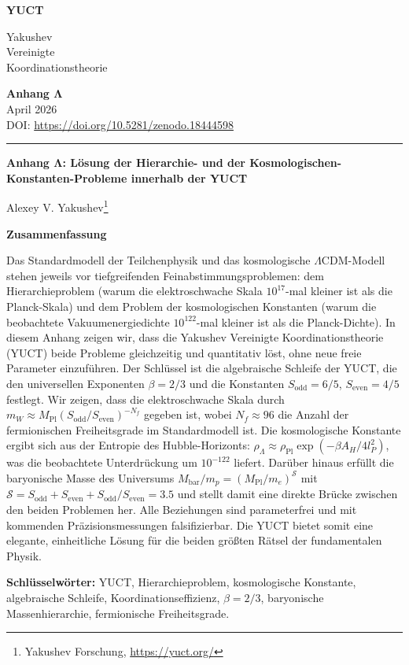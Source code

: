 \documentclass[11pt,a4paper]{article}
\theoremstyle{remark}
\newcommand{\makeheader}{%
	\noindent
	\begin{minipage}{0.17\textwidth}
		\raggedright
		{\sffamily\bfseries\color{skyblue}\fontsize{46}{46}\selectfont YUCT}%
	\end{minipage}%
	\hspace{30pt}
	\begin{minipage}{0.32\textwidth}
		\raggedright
		{\sffamily\fontsize{11}{13}\selectfont Yakushev\\ Vereinigte\\ Koordinationstheorie}%
	\end{minipage}%
	\hfill
	\begin{minipage}{0.38\textwidth}
		\raggedleft
		{\sffamily\bfseries Anhang Λ}\\
		{\sffamily April 2026}\\
		{\sffamily\footnotesize DOI: \url{https://doi.org/10.5281/zenodo.18444598}}%
	\end{minipage}
	\par\vspace{5pt}
	\noindent\textcolor{gold}{\rule{\textwidth}{1.6pt}}
	\par\vspace{0pt}
}
\begin{document}
	\renewcommand{\thepage}{\arabic{page}}
	\thispagestyle{firstpage}
	\makeheader
	
	\vspace{0cm}
	{\LARGE\bfseries Anhang Λ: Lösung der Hierarchie- und der Kosmologischen-Konstanten-Probleme innerhalb der YUCT \par}
	\vspace{0.2cm}
	
	{\large Alexey V. Yakushev\footnote{Yakushev Forschung, \url{https://yuct.org/}}} \\
	\vspace{0.0cm}
	
	{\color{darkblue}\textbf{\LARGE Zusammenfassung}} \par
	{\large
		\noindent
		Das Standardmodell der Teilchenphysik und das kosmologische \(\Lambda\)CDM-Modell stehen jeweils vor tiefgreifenden Feinabstimmungsproblemen: dem Hierarchieproblem (warum die elektroschwache Skala \(10^{17}\)-mal kleiner ist als die Planck-Skala) und dem Problem der kosmologischen Konstanten (warum die beobachtete Vakuumenergiedichte \(10^{122}\)-mal kleiner ist als die Planck-Dichte). In diesem Anhang zeigen wir, dass die Yakushev Vereinigte Koordinationstheorie (YUCT) beide Probleme gleichzeitig und quantitativ löst, ohne neue freie Parameter einzuführen. Der Schlüssel ist die algebraische Schleife der YUCT, die den universellen Exponenten \(\beta = 2/3\) und die Konstanten \(S_{\mathrm{odd}} = 6/5\), \(S_{\mathrm{even}} = 4/5\) festlegt. Wir zeigen, dass die elektroschwache Skala durch \(m_W \approx M_{\mathrm{Pl}} (S_{\mathrm{odd}}/S_{\mathrm{even}})^{-N_f}\) gegeben ist, wobei \(N_f \approx 96\) die Anzahl der fermionischen Freiheitsgrade im Standardmodell ist. Die kosmologische Konstante ergibt sich aus der Entropie des Hubble-Horizonts: \(\rho_\Lambda \approx \rho_{\mathrm{Pl}} \exp(-\beta A_H / 4l_P^2)\), was die beobachtete Unterdrückung um \(10^{-122}\) liefert. Darüber hinaus erfüllt die baryonische Masse des Universums \(M_{\mathrm{bar}}/m_p = (M_{\mathrm{Pl}}/m_e)^{\mathcal{S}}\) mit \(\mathcal{S} = S_{\mathrm{odd}} + S_{\mathrm{even}} + S_{\mathrm{odd}}/S_{\mathrm{even}} = 3.5\) und stellt damit eine direkte Brücke zwischen den beiden Problemen her. Alle Beziehungen sind parameterfrei und mit kommenden Präzisionsmessungen falsifizierbar. Die YUCT bietet somit eine elegante, einheitliche Lösung für die beiden größten Rätsel der fundamentalen Physik.
	}
	
	\vspace{0.1cm}
	\noindent
	{\color{darkblue}\textbf{Schlüsselwörter:}} YUCT, Hierarchieproblem, kosmologische Konstante, algebraische Schleife, Koordinationseffizienz, \(\beta = 2/3\), baryonische Massenhierarchie, fermionische Freiheitsgrade.
	
\end{document}
